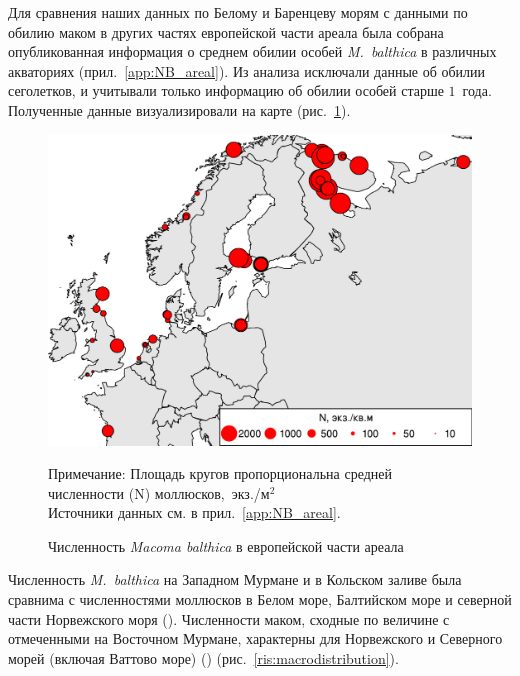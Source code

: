 
Для сравнения наших данных по Белому и Баренцеву морям с данными по обилию маком в других частях европейской части ареала была собрана опубликованная информация о среднем обилии особей {\it M.~balthica} в различных акваториях (прил.~\ref{app:NB_areal}). 
Из анализа исключали данные об обилии сеголетков, и учитывали только информацию об обилии особей старше $1$~года.
Полученные данные визуализировали на карте (рис.~\ref{ris:N_macrodistribution}).
	\begin{figure}[p]
    \includegraphics[width=\textwidth]{../macrodistribution/Nmean_ru1.pdf}
    \caption{Численность {\it Macoma balthica} в европейской части ареала}

{\footnotesize Примечание: Площадь кругов пропорциональна средней численности (N) моллюсков,~экз./м$^2$\\
Источники данных см. в прил.~\ref{app:NB_areal}.}
    \label{ris:N_macrodistribution}
	\end{figure}
Численность {\it M.~balthica} на Западном Мурмане и в Кольском заливе была сравнима с численностями моллюсков в Белом море, Балтийском море и северной части Норвежского моря (\cite{Semenova_1974, Aschan_1988, Maximovich_et_al_1991, Bonsdorff_et_al_1995, Bostrom_Bonsdorff_2000, Oug_2001, Laine_et_al_2003, Khaitov_et_al_2007, Varfolomeeva_Naumov_2013}).
Численности маком, сходные по величине с отмеченными на Восточном Мурмане, характерны для Норвежского и Северного морей (включая Ваттово море) (\cite{Brady_1943, Sneli_1968, Stromgren_et_al_1973, Beukema_1976, Jensen_Jensen_1985, Jensen_et_al_1985, Madsen_Jensen_1987, Beukema_1979, Zwarts_Wanink_1993, Reise_et_al_1994}) (рис.~\ref{ris:macrodistribution}).

